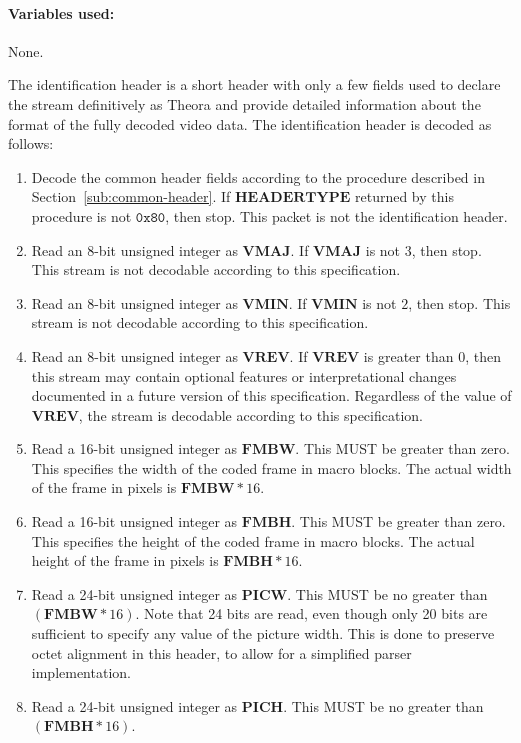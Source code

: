 \documentclass[9pt,letterpaper]{book}
\newcommand{\bitvar}[1]{\ensuremath{\mathbf{\bm{#1}}}}
\newcommand{\hex}[1]{\ensuremath{\mathtt{0x#1}}}
\numberwithin{equation}{chapter}
\numberwithin{figure}{chapter}
\numberwithin{table}{chapter}
\begin{document}
\paragraph{Variables used:} None.
\medskip

The identification header is a short header with only a few fields used to
 declare the stream definitively as Theora and provide detailed information
 about the format of the fully decoded video data.
The identification header is decoded as follows:

\begin{enumerate}
\item
Decode the common header fields according to the procedure described in
 Section~\ref{sub:common-header}.
If \bitvar{HEADERTYPE} returned by this procedure is not \hex{80}, then stop.
This packet is not the identification header.
\item
Read an 8-bit unsigned integer as \bitvar{VMAJ}.
If \bitvar{VMAJ} is not $3$, then stop.
This stream is not decodable according to this specification.
\item
Read an 8-bit unsigned integer as \bitvar{VMIN}.
If \bitvar{VMIN} is not $2$, then stop.
This stream is not decodable according to this specification.
\item
Read an 8-bit unsigned integer as \bitvar{VREV}.
If \bitvar{VREV} is greater than $0$, then this stream
may contain optional features or interpretational changes 
documented in a future version of this specification.
Regardless of the value of \bitvar{VREV}, the stream is decodable 
according to this specification.
\item
Read a 16-bit unsigned integer as \bitvar{FMBW}.
This MUST be greater than zero.
This specifies the width of the coded frame in macro blocks.
The actual width of the frame in pixels is $\bitvar{FMBW}*16$.
\item
Read a 16-bit unsigned integer as \bitvar{FMBH}.
This MUST be greater than zero.
This specifies the height of the coded frame in macro blocks.
The actual height of the frame in pixels is $\bitvar{FMBH}*16$.
\item
Read a 24-bit unsigned integer as \bitvar{PICW}.
This MUST be no greater than $(\bitvar{FMBW}*16)$.
Note that 24 bits are read, even though only 20 bits are sufficient to specify
 any value of the picture width.
This is done to preserve octet alignment in this header, to allow for a
 simplified parser implementation.
\item
Read a 24-bit unsigned integer as \bitvar{PICH}.
This MUST be no greater than $(\bitvar{FMBH}*16)$.

\end{enumerate}
\end{document}
